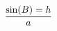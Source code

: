 \documentclass[preview]{standalone}
\begin{document}
\begin{align*}
\sin ( B ) = h \over a
\end{align*}
\end{document}
